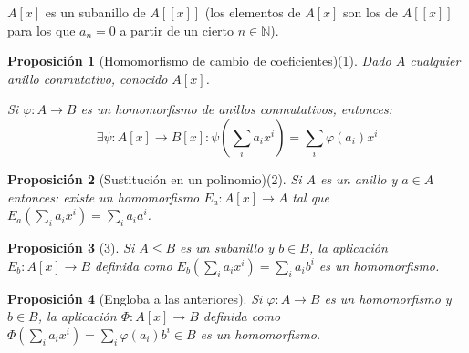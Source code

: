 \documentclass[11pt, a4paper, titlepage]{article}
\newif\IfInSansMode
\theoremstyle{theorem-style}
\newtheorem{nprop}{Proposición}[section]
\theoremstyle{definition-style}
\theoremstyle{remark-style}
\theoremstyle{example-style}
\begin{document}
$A[x]$ es un subanillo de $A[[x]]$ (los elementos de $A[x]$ son los de $A[[x]]$ para los que $a_n = 0$ a partir de un cierto $n\in \mathbb{N}$).

\begin{nprop}[Homomorfismo de cambio de coeficientes)(1]
 Dado $A$ cualquier anillo conmutativo, conocido $A[x]$.

 Si $\varphi:A \to B$ es un homomorfismo de anillos conmutativos, entonces:
 \[
 \exists \psi: A[x] \to B[x] : \psi\left(\sum_i a_i x^i\right) = \sum_i\varphi(a_i) x^i
 \]


\end{nprop}

\begin{nprop}[Sustitución en un polinomio)(2]

Si $A$ es un anillo y $a \in A$ entonces: existe un homomorfismo $E_a: A[x] \to A$ tal que $E_a(\sum_i a_i x^i) = \sum_i a_i a^i$.

\end{nprop}

\begin{nprop}[3]
Si $A \leq B$ es un subanillo y $b\in B$, la aplicación $E_b:A[x] \to B$ definida como $E_b(\sum_i a_i x^i) = \sum_i a_i b^i$ es un homomorfismo.

\end{nprop}

\begin{nprop}[Engloba a las anteriores]
Si $\varphi:A \to B$ es un homomorfismo y $b\in B$, la aplicación $\Phi:A[x] \to B$ definida como $\Phi ( \sum_i a_i x^i) = \sum_i \varphi(a_i)b^i \in B$ es un homomorfismo.

\end{nprop}
\end{document}
